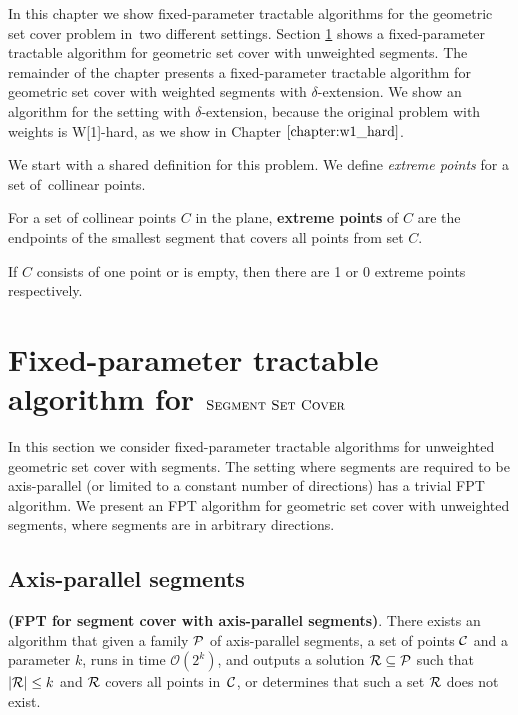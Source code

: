 In this chapter we show fixed-parameter tractable algorithms
for the geometric set cover problem in~two different settings.
Section \ref{section:fpt_unweighted} shows 
a fixed-parameter tractable algorithm for geometric set cover with unweighted segments.
The remainder of the chapter presents
a fixed-parameter tractable algorithm for geometric set cover with weighted segments
with $\delta$-extension.
We show an algorithm for the setting with $\delta$-extension,
because the original problem with weights is W[1]-hard,
as we show in Chapter $\ref{chapter:w1_hard}$.

We start with a shared definition for this problem.
We define \textit{extreme points} for a set of~collinear points.

\begin{defi}
	For a set of collinear points $C$ in the plane,
	\textbf{extreme points} of $C$ are the endpoints
	of the smallest segment that covers all points from set $C$.
	
	If $C$ consists of one point or is empty, then
	there are 1 or 0 extreme points respectively.
\end{defi}

\section{Fixed-parameter tractable algorithm for $\textsc{Segment Set Cover}$}
\label{section:fpt_unweighted}
In this section we consider fixed-parameter tractable
algorithms for unweighted geometric set cover with segments.
The setting where segments are required to be axis-parallel
(or limited to a constant number of directions) has a trivial FPT algorithm.
We present an FPT algorithm for geometric set cover
with unweighted segments, where segments are in arbitrary directions.

\subsection{Axis-parallel segments}
\begin{tw}
	\textbf{(FPT for segment cover with axis-parallel segments)}.
	There exists an algorithm that given a family $\mathcal{P}$ of
	axis-parallel segments,
	a set of points $\mathcal{C}$
	and a parameter $k$,
	runs in time $\mathcal{O}(2^k)$,
	and outputs a solution $\mathcal{R} \subseteq \mathcal{P}$
	such that $|\mathcal{R}| \le k$ and $\mathcal{R}$ covers all points in~$\mathcal{C}$,
	or determines that such a set $\mathcal{R}$ does not exist.
\end{tw}

